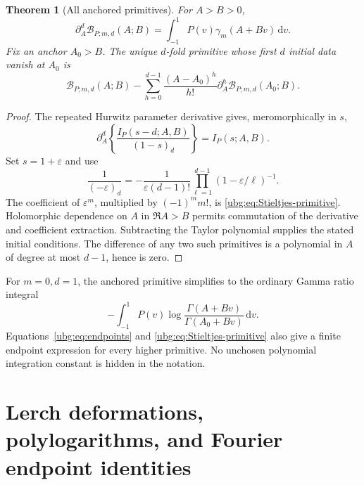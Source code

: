 \documentclass[11pt,letterpaper]{article}
\numberwithin{equation}{section}
\newtheorem{theorem}{Theorem}[section]
\theoremstyle{definition}\newtheorem{definition}[theorem]{Definition}
\theoremstyle{remark}\newtheorem{remark}[theorem]{Remark}
\newcommand{\dd}{\,\mathrm d}\newcommand{\ii}{\mathrm i}
\begin{document}
\begin{theorem}[All anchored primitives]\label{ubg:thm:primitives}
For $A>B>0$,
\begin{equation}\label{ubg:eq:primitive-derivative}
 \partial_A^d\mathcal B_{P;m,d}(A;B)
       =\int_{-1}^1P(v)\gamma_m(A+Bv)\dd v.
\end{equation}
Fix an anchor $A_0>B$. The unique $d$-fold primitive whose first $d$
initial data vanish at $A_0$ is
\begin{equation}\label{ubg:eq:anchored}
 \mathcal B_{P;m,d}(A;B)
 -\sum_{h=0}^{d-1}\frac{(A-A_0)^h}{h!}
            \partial_A^h\mathcal B_{P;m,d}(A_0;B).
\end{equation}
\end{theorem}
\begin{proof}
The repeated Hurwitz parameter derivative gives, meromorphically in $s$,
\[
 \partial_A^d\left\{\frac{I_P(s-d;A,B)}{(1-s)_d}\right\}
                                =I_P(s;A,B).
\]
Set $s=1+\varepsilon$ and use
\[
 \frac1{(-\varepsilon)_d}
 =-\frac1{\varepsilon(d-1)!}
       \prod_{\ell=1}^{d-1}(1-\varepsilon/\ell)^{-1}.
\]
The coefficient of $\varepsilon^m$, multiplied by $(-1)^mm!$, is
\eqref{ubg:eq:Stieltjes-primitive}. Holomorphic dependence on $A$ in
$\Re A>B$ permits commutation of the derivative and coefficient
extraction. Subtracting the Taylor polynomial supplies the stated
initial conditions. The difference of any two such primitives is a
polynomial in $A$ of degree at most $d-1$, hence is zero.
\end{proof}

For $m=0,d=1$, the anchored primitive simplifies to the ordinary Gamma
ratio integral
\begin{equation}\label{ubg:eq:Gamma-anchored}
 -\int_{-1}^1P(v)
       \log\frac{\Gamma(A+Bv)}{\Gamma(A_0+Bv)}\dd v.
\end{equation}
Equations~\eqref{ubg:eq:endpoints} and
\eqref{ubg:eq:Stieltjes-primitive} also give a finite endpoint expression
for every higher primitive. No unchosen polynomial integration constant
is hidden in the notation.

\section{Lerch deformations, polylogarithms, and Fourier endpoint identities}
\label{ubg:sec:polylog}
\end{document}
